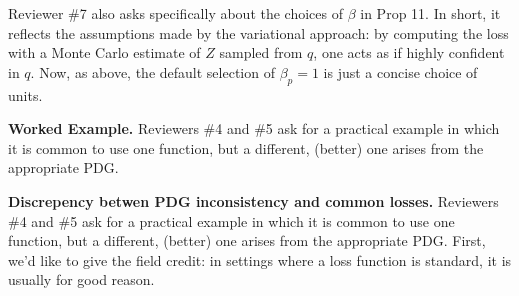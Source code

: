 \documentclass{article}
\theoremstyle{plain}
\theoremstyle{definition}
\newcommand{\V}{\mathcal V}
\begin{document}

Reviewer \#7 also asks specifically about the choices of $\beta$ in Prop 11.
In short, it reflects the assumptions made by the variational approach: by computing the loss with a Monte Carlo estimate of $Z$ sampled from $q$, one acts as if highly confident in $q$.
Now, as above, the default selection of $\beta_p=1$ is just a concise choice of units.

\textbf{Worked Example.}
Reviewers \#4 and \#5 ask for a practical example in which it is common to use one function, but a different, (better) one arises from the appropriate PDG.


\textbf{Discrepency betwen PDG inconsistency and common losses.}
Reviewers \#4 and \#5 ask for a practical example in which it is common to use one function, but a different, (better) one arises from the appropriate PDG.
First, we'd like to give the field credit: in settings where a loss function is standard, it is usually for good reason.
%
%
\end{document}
